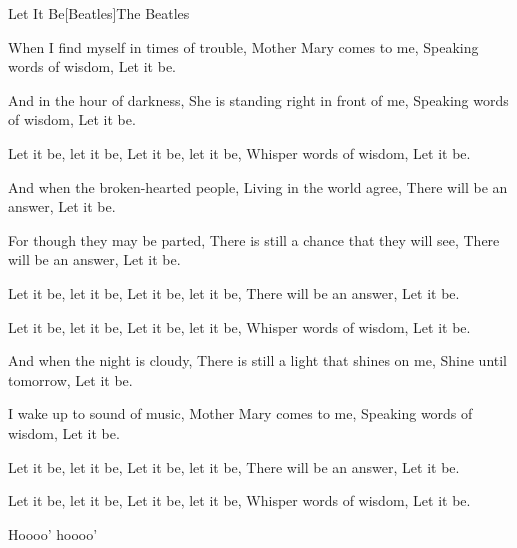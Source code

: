 \begin{Song}{Let It Be}[Beatles]{The Beatles}
\begin{multicols}{2}

\begin{Verse}
When I find myself in times of trouble,
Mother Mary comes to me,
Speaking words of wisdom,
Let it be.
\espaceInterStrophe

And in the hour of darkness,
She is standing right in front of me,
Speaking words of wisdom,
Let it be.
\end{Verse}
\espaceInterStrophe

\begin{Chorus}
Let it be, let it be,
Let it be, let it be,
Whisper words of wisdom,
Let it be.
\end{Chorus}
\espaceInterStrophe

\begin{Verse}
And when the broken-hearted people,
Living in the world agree,
There will be an answer,
Let it be.
\espaceInterStrophe

For though they may be parted,
There is still a chance that they will see,
There will be an answer,
Let it be.
\end{Verse}
\espaceInterStrophe

\begin{Chorus}
Let it be, let it be,
Let it be, let it be,
There will be an answer,
Let it be.
\espaceInterStrophe

Let it be, let it be,
Let it be, let it be,
Whisper words of wisdom,
Let it be.
\end{Chorus}
\espaceInterStrophe

\espaceInterStrophe

\begin{Verse}
And when the night is cloudy,
There is still a light that shines on me,
Shine until tomorrow,
Let it be.
\espaceInterStrophe

I wake up to sound of music,
Mother Mary comes to me,
Speaking words of wisdom,
Let it be.
\end{Verse}
\espaceInterStrophe

\begin{Chorus}
Let it be, let it be,
Let it be, let it be,
There will be an answer,
Let it be.
\espaceInterStrophe

Let it be, let it be,
Let it be, let it be,
Whisper words of wisdom,
Let it be.
\espaceInterStrophe

Hoooo' hoooo'
\end{Chorus}


\end{multicols}
\end{Song}
